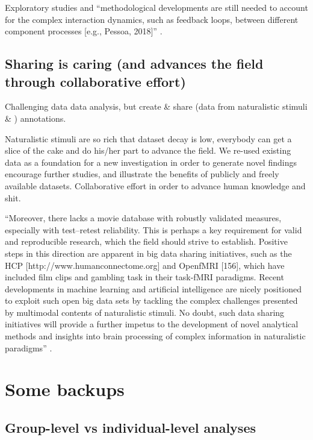 %
Exploratory studies and ``methodological developments are still needed to
account for the complex interaction dynamics, such as feedback loops, between
different component processes [e.g., Pessoa, 2018]''
\citep{saarimaki2021naturalistic}.


\subsection{Sharing is caring (and advances the field through collaborative
effort)}

%
Challenging data data analysis, but create \& share (data from naturalistic
stimuli \& ) annotations.

%
Naturalistic stimuli are so rich that dataset decay is low, everybody can get
a slice of the cake and do his/her part to advance the field.
%
We re-used existing data as a foundation for a new investigation in order to
generate novel findings encourage further studies, and illustrate the benefits
of publicly and freely available datasets.
%
Collaborative effort in order to advance human knowledge and shit.

%
``Moreover, there lacks a movie database with robustly validated measures,
especially with test--retest reliability.
%
This is perhaps a key requirement for valid and reproducible research, which the
field should strive to establish.
%
Positive steps in this direction are apparent in big data sharing initiatives,
such as the HCP [http://www.humanconnectome.org] and OpenfMRI [156], which have
included film clips and gambling task in their task-fMRI paradigms.
%
Recent developments in machine learning and artificial intelligence are nicely
positioned to exploit such open big data sets by tackling the complex challenges
presented by multimodal contents of naturalistic stimuli.
%
No doubt, such data sharing initiatives will provide a further impetus to the
development of novel analytical methods and insights into brain processing of
complex information in naturalistic paradigms''
\citep{sonkusare2019naturalistic}.



\pagebreak


\section{Some backups}


\subsection{Group-level vs individual-level analyses}


